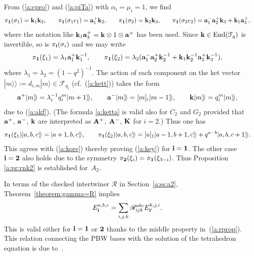 \documentclass[11pt]{article}
\begin{document}
From (\ref{a:cpro}) and (\ref{a:piTa}) with $\alpha_i=\mu_i=1$, we f\/ind
\begin{gather*}
\pi_{{\bf 1}}(\sigma_1) = {\bf k}_1{\bf k}_2,\qquad\!
\pi_{{\bf 1}}(\sigma_1e_1)
= {\rm{\bf a}}^+_1{\bf k}_2,\qquad\!
\pi_{{\bf 1}}(\sigma_2) ={\bf k}_2{\bf k}_3,\qquad\!
\pi_{{\bf 1}}(\sigma_2e_2) =
{\rm{\bf a}}^-_1{\rm{\bf a}}^+_2{\bf k}_3
+{\bf k}_1{\rm{\bf a}}^+_3,
\end{gather*}
where the notation like
${\bf k}_1{\rm{\bf a}}^+_3 = {\bf k}\otimes 1 \otimes {\rm{\bf a}}^+$
has been used.
Since ${\bf k}\in \mathrm{End}({\mathcal F}_q)$ is invertible,
so is $\pi_{\bf i}(\sigma_i)$ and we may write
\begin{gather*}
\pi_{\bf 1}(\xi_1) = \lambda_1
{\rm{\bf a}}^+_1{\bf k}^{-1}_1,\qquad
\pi_{\bf 1}(\xi_2) = \lambda_2
({\rm{\bf a}}^-_1{\rm{\bf a}}^+_2{\bf k}^{-1}_2
+{\bf k}_1{\bf k}^{-1}_2{\rm{\bf a}}^+_3{\bf k}^{-1}_3),
\end{gather*}
where $\lambda_1=\lambda_2 = (1-q^2)^{-1}$.
The action of each component on the ket vector
$|m\rangle\!\rangle :=d_{i,m}|m\rangle \in {\mathcal F}_{q_i}$
(cf.~(\ref{a:kett})) takes the form
\begin{gather}\label{a:ketta}
{\rm{\bf a}}^+|m\rangle\!\rangle =
\lambda_i^{-1}q_i^m|m+1\rangle\!\rangle,\qquad
{\rm{\bf a}}^-|m\rangle\!\rangle =
[m]_i|m-1\rangle\!\rangle,\qquad
{\bf k}|m\rangle\!\rangle=q_i^m|m\rangle\!\rangle,
\end{gather}
due to (\ref{a:akf}).
(The formula \eqref{a:ketta} is valid also for $C_2$ and $G_2$
provided that ${\rm{\bf a}}^+$, ${\rm{\bf a}}^-$, ${\rm{\bf k}}$
are interpreted as
${\rm{\bf A}}^+$, ${\rm{\bf A}}^-$, ${\rm{\bf K}}$
for $i=2$.)
Thus one has
\begin{gather*}
\pi_{\bf 1}(\xi_1)|a,b,c\rangle\!\rangle =
|a+1,b,c\rangle\!\rangle,
\qquad
\pi_{\bf 1}(\xi_2)|a,b,c\rangle\!\rangle =
[a]_1|a-1,b+1,c\rangle\!\rangle
+q^{a-b}|a,b,c+1\rangle\!\rangle.
\end{gather*}
This agrees with (\ref{a:kore}) thereby
proving (\ref{a:key}) for ${\bf i}={\bf 1}$.
The other case  ${\bf i}={\bf 2}$ also holds due to the
symmetry $\pi_{\bf 2}(\xi_i) = \pi_{\bf 1}(\xi_{3-i})$.
Thus Proposition \ref{a:pr:rnk2} is established for~$A_2$.

In terms of the checked intertwiner $\mathscr{R}$ in Section~\ref{a:ss:a2},
Theorem~\ref{theorem:gamma=R} implies
\begin{gather*}
E^{a,b,c}_{\bf i} = \sum_{i,j,k}
\mathscr{R}^{a b c}_{i j k} E^{k,j,i}_{{\bf i}'}.
\end{gather*}
This is valid either for ${\bf i}={\bf 1}$ or ${\bf 2}$
thanks to the middle property in~(\ref{a:rprop}).
This relation connecting the PBW bases with
the solution of the tetrahedron equation is due to~\cite{S08}.
\end{document}
